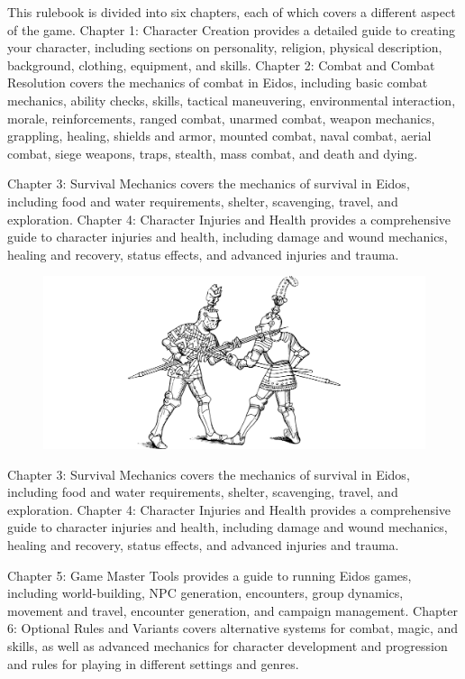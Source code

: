 \documentclass[12pt]{book}
\begin{document}
This rulebook is divided into six chapters, each of which covers a different aspect of the game. Chapter 1: Character Creation provides a detailed guide to creating your character, including sections on personality, religion, physical description, background, clothing, equipment, and skills. Chapter 2: Combat and Combat Resolution covers the mechanics of combat in Eidos, including basic combat mechanics, ability checks, skills, tactical maneuvering, environmental interaction, morale, reinforcements, ranged combat, unarmed combat, weapon mechanics, grappling, healing, shields and armor, mounted combat, naval combat, aerial combat, siege weapons, traps, stealth, mass combat, and death and dying.

Chapter 3: Survival Mechanics covers the mechanics of survival in Eidos, including food and water requirements, shelter, scavenging, travel, and exploration. Chapter 4: Character Injuries and Health provides a comprehensive guide to character injuries and health, including damage and wound mechanics, healing and recovery, status effects, and advanced injuries and trauma.

\begin{figure}[h]
    \centering
    \includegraphics[width=\textwidth]{./images/presentation02.pdf}
\end{figure}

Chapter 3: Survival Mechanics covers the mechanics of survival in Eidos, including food and water requirements, shelter, scavenging, travel, and exploration. Chapter 4: Character Injuries and Health provides a comprehensive guide to character injuries and health, including damage and wound mechanics, healing and recovery, status effects, and advanced injuries and trauma.

Chapter 5: Game Master Tools provides a guide to running Eidos games, including world-building, NPC generation, encounters, group dynamics, movement and travel, encounter generation, and campaign management. Chapter 6: Optional Rules and Variants covers alternative systems for combat, magic, and skills, as well as advanced mechanics for character development and progression and rules for playing in different settings and genres.
\end{document}
